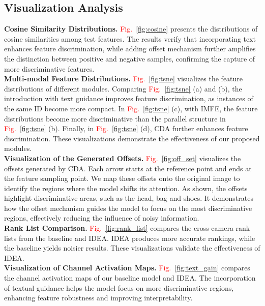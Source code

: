 \subsection{Visualization Analysis}
\textbf{Cosine Similarity Distributions.}
\textcolor{red}{Fig.}~\ref{fig:cosine} presents the distributions of cosine similarities among test features.
%
The results verify that incorporating text enhances feature discrimination, while adding offset mechanism further amplifies the distinction between positive and negative samples, confirming the capture of more discriminative features.
\\
\textbf{Multi-modal Feature Distributions.}
\textcolor{red}{Fig.}~\ref{fig:tsne} visualizes the feature distributions of different modules.
%
Comparing \textcolor{red}{Fig.}~\ref{fig:tsne} (a) and (b), the introduction with text guidance improves feature discrimination, as instances of the same ID become more compact.
%
In \textcolor{red}{Fig.}~\ref{fig:tsne} (c), with IMFE, the feature distributions become more discriminative than the parallel structure in \textcolor{red}{Fig.}~\ref{fig:tsne} (b).
%
Finally, in \textcolor{red}{Fig.}~\ref{fig:tsne} (d), CDA further enhances feature discrimination.
%
These visualizations demonstrate the effectiveness of our proposed modules.
%
\\
\textbf{Visualization of the Generated Offsets.}
\textcolor{red}{Fig.}~\ref{fig:off_set} visualizes the offsets generated by CDA.
%
Each arrow starts at the reference point and ends at the feature sampling point.
%
We map these offsets onto the original image to identify the regions where the model shifts its attention.
%
As shown, the offsets highlight discriminative areas, such as the head, bag and shoes. 
%
It demonstrates how the offset mechanism guides the model to focus on the most discriminative regions, effectively reducing the influence of noisy information.
\\
\textbf{Rank List Comparison.}
\textcolor{red}{Fig.}~\ref{fig:rank_list} compares the cross-camera rank lists from the baseline and IDEA.
%
IDEA produces more accurate rankings, while the baseline yields noisier results.
%
These visualizations validate the effectiveness of IDEA.
\\
\textbf{Visualization of Channel Activation Maps.}
\textcolor{red}{Fig.}~\ref{fig:text_gain} compares the channel activation maps of our baseline model and IDEA.
%
The incorporation of textual guidance helps the model focus on more discriminative regions, enhancing feature robustness and improving interpretability.



